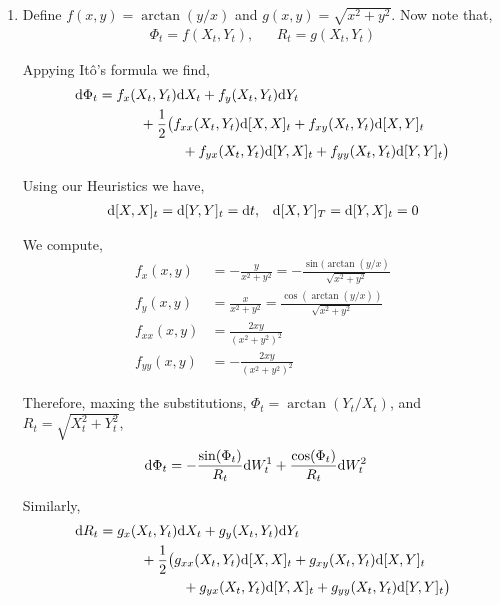 \begin{solution}[Solution]
\begin{enumerate}[label=(\alph*)]
    \item Define \( f(x,y) = \arctan(y/x) \) and \( g(x,y) = \sqrt{x^2+y^2} \). Now note that,
        \begin{align*}
            \Phi_t = f(X_t,Y_t), && R_t = g(X_t,Y_t)
        \end{align*}

        Appying It\^o's formula we find,
        \begin{align*}
            \mathrm{d} \Phi_t &=  f_x(X_t,Y_t)\mathrm{d} X_t + f_y(X_t,Y_t)\mathrm{d} Y_t 
            \\&\hspace{3em}+ \frac{1}{2}\big(f_{xx}(X_t,Y_t)\mathrm{d}[X,X]_t + f_{xy}(X_t,Y_t)\mathrm{d} [X,Y]_t 
            \\&\hspace{6em}+ f_{yx}(X_t,Y_t)\mathrm{d}[Y,X]_t + f_{yy}(X_t,Y_t)\mathrm{d}[Y,Y]_t\big) 
        \end{align*}
        
        Using our Heuristics we have,
        \begin{align*}
            \mathrm{d}[X,X]_t = \mathrm{d}[Y,Y]_t = \mathrm{d} t, && \mathrm{d}[X,Y]_T = \mathrm{d}[Y,X]_t = 0
        \end{align*}
        
        We compute,
        \begin{align*}
            f_x(x,y) &= -\frac{y}{x^2+y^2} = - \frac{\sin(\arctan(y/x)}{\sqrt{x^2+y^2}} \\
            f_y(x,y) &= \frac{x}{x^2+y^2} = \frac{\cos(\arctan(y/x))}{\sqrt{x^2+y^2}}\\
            f_{xx}(x,y) &= \frac{2xy}{(x^2+y^2)^2} \\ 
            f_{yy}(x,y) &= -\frac{2xy}{(x^2+y^2)^2}
        \end{align*}
        
        Therefore, maxing the substitutions, \( \Phi_t = \arctan(Y_t/X_t) \), and \( R_t = \sqrt{X_t^2+Y_t^2}  \),
        \begin{align*}
            \mathrm{d} \Phi_t &= - \frac{\sin(\Phi_t)}{R_t}\mathrm{d} W_t^1 + \frac{\cos(\Phi_t)}{R_t}\mathrm{d} W_t^2
        \end{align*}
        
        Similarly,
        \begin{align*}
            \mathrm{d} R_t &=  g_x(X_t,Y_t)\mathrm{d} X_t + g_y(X_t,Y_t)\mathrm{d} Y_t
            \\&\hspace{3em}+ \frac{1}{2}\big(g_{xx}(X_t,Y_t)\mathrm{d}[X,X]_t + g_{xy}(X_t,Y_t)\mathrm{d} [X,Y]_t 
            \\&\hspace{6em}+ g_{yx}(X_t,Y_t)\mathrm{d}[Y,X]_t + g_{yy}(X_t,Y_t)\mathrm{d}[Y,Y]_t\big) 
        \end{align*}
        

\end{enumerate}
\end{solution}
